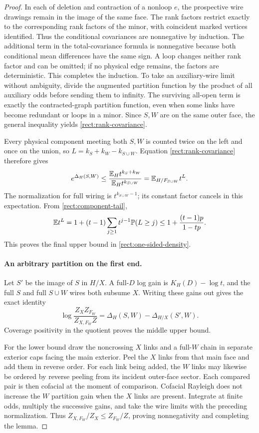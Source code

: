 \begin{proof}
In each of deletion and contraction of a nonloop $e$, the prospective
wire drawings remain in the image of the same face.  The rank factors
restrict exactly to the corresponding rank factors of the minor,
with coincident marked vertices identified.  Thus the conditional
covariances are nonnegative by induction.  The additional term in
the total-covariance formula is nonnegative because both conditional
mean differences have the same sign.  A loop changes neither rank
factor and can be omitted; if no physical edge remains, the factors
are deterministic.  This completes the induction.  To take an
auxiliary-wire limit without ambiguity, divide the augmented
partition function by the product of all auxiliary odds before
sending them to infinity.  The surviving all-open term is exactly
the contracted-graph partition function, even when some links have
become redundant or loops in a minor.  Since $S,W$ are on the same
outer face, the general inequality yields
\eqref{rect:rank-covariance}.

Every physical component meeting both $S,W$ is counted twice on the
left and once on the union, so
$L=k_S+k_W-k_{S\cup W}$.  Equation
\eqref{rect:rank-covariance} therefore gives
\begin{equation}
 e^{\Delta_H(S,W)}
 \le\frac{\mathbb E_H t^{k_S+k_W}}{\mathbb E_H t^{k_{S\cup W}}}
 =\mathbb E_{H/F_{S\cup W}}t^L.
 \label{rect:interaction-moment}
\end{equation}
The normalization for full wiring is $t^{k_{S\cup W}-1}$; its
constant factor cancels in this expectation.  From
\eqref{rect:component-tail},
\[
 \mathbb E t^L
 =1+(t-1)\sum_{j\ge1}t^{j-1}\mathbb P(L\ge j)
 \le1+\frac{(t-1)p}{1-tp}.
\]
This proves the final upper bound in
\eqref{rect:one-sided-density}.

\paragraph{An arbitrary partition on the first end.}
Let $S'$ be the image of $S$ in $H/X$.  A full-$D$ log gain is
$K_H(D)-\log t$, and the full $S$ and full $S\cup W$ wires both
subsume $X$.  Writing these gains out gives the exact identity
\begin{equation}
 \log\frac{Z_XZ_{F_W}}{Z_{X,F_W}Z}
 =\Delta_H(S,W)-\Delta_{H/X}(S',W).
 \label{rect:interaction-difference}
\end{equation}
Coverage positivity in the quotient proves the middle upper bound.

For the lower bound draw the noncrossing $X$ links and a full-$W$
chain in separate exterior caps facing the main exterior.  Peel the
$X$ links from that main face and add them in reverse order.  For
each link being added, the $W$ links may likewise be ordered by
reverse peeling from its incident outer-face sector.  Each compared
pair is then cofacial at the moment of comparison.  Cofacial Rayleigh
does not increase the $W$ partition gain when the $X$ links are present.
Integrate at finite odds, multiply the successive gains, and take
the wire limits with the preceding normalization.  Thus
$Z_{X,F_W}/Z_X\le Z_{F_W}/Z$, proving nonnegativity and completing
the lemma.
\end{proof}

